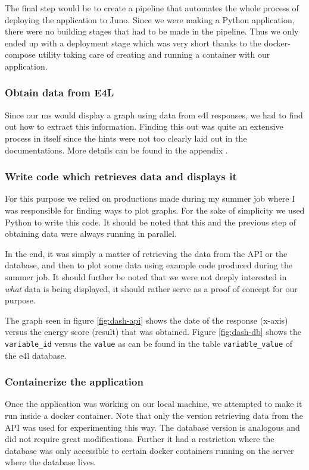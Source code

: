 The final step would be to create a pipeline that automates the whole
process of deploying the application to Juno. Since we were making a
Python application, there were no building stages that had to be made
in the pipeline. Thus we only ended up with a deployment stage which
was very short thanks to the docker-compose utility taking care of
creating and running a container with our application.

\subsubsection{Obtain data from E4L}

Since our \gls{ms} would display a graph using data from \gls{e4l}
responses, we had to find out how to extract this information. Finding
this out was quite an extensive process in itself since the hints were
not too clearly laid out in the documentations. More details can be
found in the appendix .

\subsubsection{Write code which retrieves data and displays it}

For this purpose we relied on productions made during my summer job
where I was responsible for finding ways to plot graphs. For the sake
of simplicity we used Python to write this code. It should be noted
that this and the previous step of obtaining data were always running
in parallel.

In the end, it was simply a matter of retrieving the data from the API
or the database, and then to plot some data using example code
produced during the summer job. It should further be noted that we
were not deeply interested in \textit{what} data is being displayed, it should
rather serve as a proof of concept for our purpose.

The graph seen in figure \ref{fig:dash-api} shows the date of the
response (x-axis) versus the energy score (result) that was obtained.
Figure \ref{fig:dash-db} shows the \verb|variable_id| versus the
\verb|value| as can be found in the table \verb|variable_value| of the
\gls{e4l} database.

\subsubsection{Containerize the application}

Once the application was working on our local machine, we attempted to make it run
inside a docker container. Note that only the version retrieving data
from the API was used for experimenting this way. The database version
is analogous and did not require great modifications. Further it had a
restriction where the database was only accessible to certain docker
containers running on the server where the database lives.

